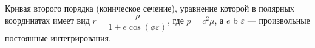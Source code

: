 Кривая второго порядка (коническое сечение), уравнение которой в полярных координатах имеет вид $r=\dfrac{\rho}{1+e\cos(\phi\varepsilon)}$, где $p=c^2\mu$, а $e$ b $\varepsilon$ --- произвольные постоянные интегрирования.
